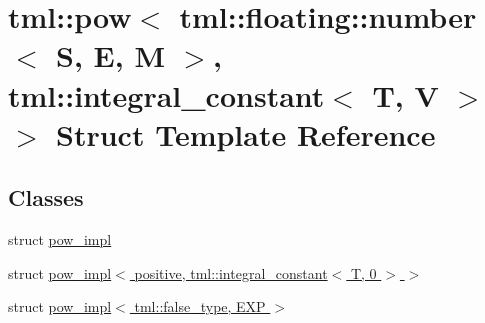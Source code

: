 \hypertarget{structtml_1_1pow_3_01tml_1_1floating_1_1number_3_01_s_00_01_e_00_01_m_01_4_00_01tml_1_1integral_6367e7571075cd8d5ef527bb120dcef8}{\section{tml\+:\+:pow$<$ tml\+:\+:floating\+:\+:number$<$ S, E, M $>$, tml\+:\+:integral\+\_\+constant$<$ T, V $>$ $>$ Struct Template Reference}
\label{structtml_1_1pow_3_01tml_1_1floating_1_1number_3_01_s_00_01_e_00_01_m_01_4_00_01tml_1_1integral_6367e7571075cd8d5ef527bb120dcef8}
}
\subsection*{Classes}
\begin{DoxyCompactItemize}
\item 
struct \hyperlink{structtml_1_1pow_3_01tml_1_1floating_1_1number_3_01_s_00_01_e_00_01_m_01_4_00_01tml_1_1integral_bb3bb188be847782d25c365342089b4b}{pow\+\_\+impl}
\item 
struct \hyperlink{structtml_1_1pow_3_01tml_1_1floating_1_1number_3_01_s_00_01_e_00_01_m_01_4_00_01tml_1_1integral_19d77fbc5d11f0f5c967f26a9e50ca00}{pow\+\_\+impl$<$ positive, tml\+::integral\+\_\+constant$<$ T, 0 $>$ $>$}
\item 
struct \hyperlink{structtml_1_1pow_3_01tml_1_1floating_1_1number_3_01_s_00_01_e_00_01_m_01_4_00_01tml_1_1integral_4a210a0605b90a001e8ae02fa541b57f}{pow\+\_\+impl$<$ tml\+::false\+\_\+type, E\+X\+P $>$}
\end{DoxyCompactItemize}
